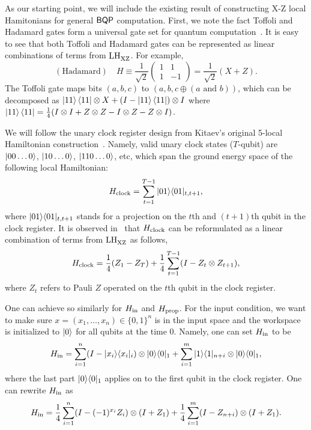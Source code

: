 As our starting point, we will include the existing result of constructing X-Z local Hamitonians for general $\operatorname{\mathsf{BQP}}$ computation.
First, we note the fact Toffoli and Hadamard gates form a universal gate set for quantum computation~\cite{Shi03, quant-ph/0301040}.
It is easy to see that both Toffoli and Hadamard gates can be represented as linear combinations of terms from $\mathrm{LH}_{\mathrm{XZ}}^{}$. For example,
 \begin{equation}
     \mathrm{(Hadamard)} \quad H \equiv \frac{1}{\sqrt{2}} \begin{pmatrix}1&1\\1&-1\end{pmatrix} = \frac{1}{\sqrt{2}}\left (X+Z\right).
 \end{equation}
 The Toffoli gate maps bits $(a,b,c)$ to $(a,b, c \oplus (a \text{ and } b))$, which can be decomposed as $\ket{11}\bra{11}\otimes X+(I-\ket{11}\bra{11})\otimes I$ where $\ket{11}\bra{11}=\frac{1}{4}(I\otimes I+Z\otimes Z-I\otimes Z-Z\otimes I)$.
 
We will follow the unary clock register design from Kitaev's original 5-local Hamiltonian construction~\cite{kitaev2002classical}. Namely, valid unary clock states ($T$-qubit) are $\ket{00\ldots0}$, $\ket{10\dots0}$, $\ket{110\ldots0}$, etc, which span the ground energy space of the following local Hamiltonian:
\begin{equation}
    H_{\mathrm{clock}}= \sum_{t=1}^{T-1}|01\rangle\langle 01|_{t,t+1},
\end{equation}
where $|01\rangle\langle 01|_{t,t+1}$ stands for a projection on the $t$th and $(t+1)$th qubit in the clock register.
It is observed in~\cite{PhysRevA.78.012352} that $H_{\mathrm{clock}}$ can be reformulated as a linear combination of terms from $\mathrm{LH}_{\mathrm{XZ}}^{}$ as follows,
\begin{equation} \label{eqn:Hclock}
   H_{\mathrm{clock}}= \frac{1}{4}(Z_1 - Z_T) + \frac{1}{4}\sum_{t=1}^{T-1}(I-Z_t\otimes Z_{t+1}),
\end{equation}
where $Z_t$ refers to Pauli $Z$ operated on the $t$th qubit in the clock register.

One can achieve so similarly for $H_{\mathrm{in}}$ and $H_{\mathrm{prop}}$. For the input condition, we want to make sure $x=(x_1, \ldots, x_n) \in \{0,1\}^n$ is in the input space and the workspace is initialized to $\ket{0}$ for all qubits at the time $0$. Namely, one can set $H_{\mathrm{in}}$ to be
\begin{equation}
    H_{\mathrm{in}} = \sum_{i=1}^n(I- |x_i\rangle\langle x_i|_i)\otimes |0\rangle\langle 0|_1 + \sum_{i=1}^m |1\rangle\langle 1|_{n+i} \otimes |0\rangle\langle 0|_1,
\end{equation}
where the last part $|0\rangle\langle 0|_1$ applies on to the first qubit in the clock register. One can rewrite $H_{\mathrm{in}}$ as
\begin{equation}\label{eqn:Hin}
 H_{\mathrm{in}}=\frac{1}{4}\sum_{i=1}^n(I-(-1)^{x_i}Z_i)\otimes(I+Z_1) + \frac{1}{4} \sum_{i=1}^m (I - Z_{n+i}) \otimes (I + Z_1).
\end{equation}

